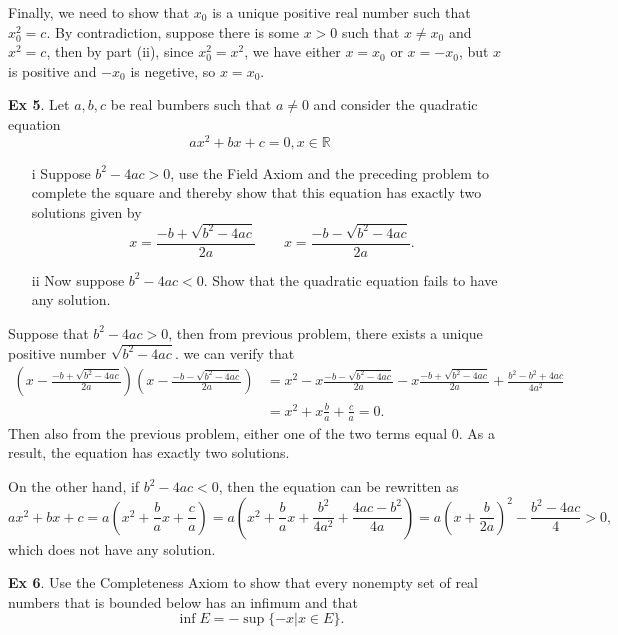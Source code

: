 Finally, we need to show that $x_0$ is a unique positive real number such that $x_0^2=c$. By contradiction, suppose there is some $x>0$ such that $x\neq x_0$ and $x^2=c$, then by part (ii), since $x_0^2=x^2$, 
we have either $x= x_0$ or $x=-x_0$, but $x$ is positive and $-x_0$ is negetive, so $x=x_0$. 

\noindent \textbf{Ex 5}. Let $a, b, c$ be real bumbers such that $a \neq 0$ and consider the quadratic equation
\begin{equation*}
    ax^2 + bx + c = 0, x \in \mathbb R
\end{equation*}
\begin{itemize}
    \item [i] Suppose $b^2-4ac > 0$, use the Field Axiom and the preceding problem to complete the square and thereby show that this equation has exactly two solutions given by 
    \begin{equation*}
        x = \frac{-b + \sqrt{b^2 - 4ac}}{2a} \quad \quad x = \frac{-b-\sqrt{b^2 -4ac}}{2a}.
    \end{equation*}
    \item [ii] Now suppose $b^2 -4ac < 0$. Show that the quadratic equation fails to have any solution.
\end{itemize}
Suppose that $b^2 - 4ac > 0$, then from previous problem, there exists a unique positive number $\sqrt{b^2 - 4ac}$. we can verify that 
\begin{align*}
    \left( x -  \frac{-b + \sqrt{b^2 - 4ac}}{2a} \right) \left( x - \frac{-b-\sqrt{b^2 -4ac}}{2a} \right) &= x^2 - x\frac{-b-\sqrt{b^2 -4ac}}{2a} - x  \frac{-b + \sqrt{b^2 - 4ac}}{2a} + \frac{b^2 - b^2 + 4ac}{4a^2}\\
    &= x^2 + x \frac{b}{a} + \frac{c}{a} = 0.
\end{align*}
Then also from the previous problem, either one of the two terms equal 0. As a result, the equation has exactly two solutions.

On the other hand, if $b^2 - 4ac<0$, then the equation can be rewritten as 
\begin{equation*}
    ax^2 + bx + c = a \left(x^2 + \frac{b}{a}x + \frac{c}{a}\right) = a\left(x^2 + \frac{b}{a}x+ \frac{b^2}{4a^2} + \frac{4ac - b^2}{4a}\right) = a\left( x + \frac{b}{2a}\right)^2 - \frac{b^2-4ac}{4} > 0,
\end{equation*}
which does not have any solution.

\noindent \textbf{Ex 6}. Use the Completeness Axiom to show that every nonempty set of real numbers that is bounded below has an infimum and that 
\begin{equation*}
    \inf E = - \sup \{-x | x \in E\}.
\end{equation*}


